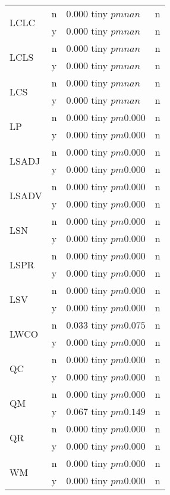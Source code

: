 \begin{table}
\begin{tabular}{llll}
\cline{1-4}
\multirow[t]{2}{*}{LCLC} & n & 0.000 tiny $ pm nan$ & n \\
 & y & 0.000 tiny $ pm nan$ & n \\
\cline{1-4}
\multirow[t]{2}{*}{LCLS} & n & 0.000 tiny $ pm nan$ & n \\
 & y & 0.000 tiny $ pm nan$ & n \\
\cline{1-4}
\multirow[t]{2}{*}{LCS} & n & 0.000 tiny $ pm nan$ & n \\
 & y & 0.000 tiny $ pm nan$ & n \\
\cline{1-4}
\multirow[t]{2}{*}{LP} & n & 0.000 tiny $ pm 0.000$ & n \\
 & y & 0.000 tiny $ pm 0.000$ & n \\
\cline{1-4}
\multirow[t]{2}{*}{LSADJ} & n & 0.000 tiny $ pm 0.000$ & n \\
 & y & 0.000 tiny $ pm 0.000$ & n \\
\cline{1-4}
\multirow[t]{2}{*}{LSADV} & n & 0.000 tiny $ pm 0.000$ & n \\
 & y & 0.000 tiny $ pm 0.000$ & n \\
\cline{1-4}
\multirow[t]{2}{*}{LSN} & n & 0.000 tiny $ pm 0.000$ & n \\
 & y & 0.000 tiny $ pm 0.000$ & n \\
\cline{1-4}
\multirow[t]{2}{*}{LSPR} & n & 0.000 tiny $ pm 0.000$ & n \\
 & y & 0.000 tiny $ pm 0.000$ & n \\
\cline{1-4}
\multirow[t]{2}{*}{LSV} & n & 0.000 tiny $ pm 0.000$ & n \\
 & y & 0.000 tiny $ pm 0.000$ & n \\
\cline{1-4}
\multirow[t]{2}{*}{LWCO} & n & 0.033 tiny $ pm 0.075$ & n \\
 & y & 0.000 tiny $ pm 0.000$ & n \\
\cline{1-4}
\multirow[t]{2}{*}{QC} & n & 0.000 tiny $ pm 0.000$ & n \\
 & y & 0.000 tiny $ pm 0.000$ & n \\
\cline{1-4}
\multirow[t]{2}{*}{QM} & n & 0.000 tiny $ pm 0.000$ & n \\
 & y & 0.067 tiny $ pm 0.149$ & n \\
\cline{1-4}
\multirow[t]{2}{*}{QR} & n & 0.000 tiny $ pm 0.000$ & n \\
 & y & 0.000 tiny $ pm 0.000$ & n \\
\cline{1-4}
\multirow[t]{2}{*}{WM} & n & 0.000 tiny $ pm 0.000$ & n \\
 & y & 0.000 tiny $ pm 0.000$ & n \\

\end{tabular}
\end{table}
